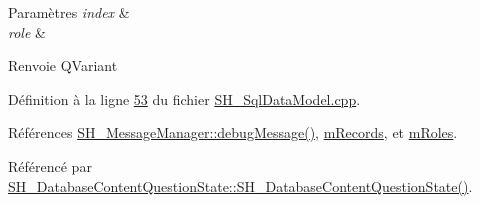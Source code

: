 \begin{DoxyParams}{Paramètres}
{\em index} & \\
\hline
{\em role} & \\
\hline
\end{DoxyParams}
\begin{DoxyReturn}{Renvoie}
Q\-Variant 
\end{DoxyReturn}


Définition à la ligne \hyperlink{SH__SqlDataModel_8cpp_source_l00053}{53} du fichier \hyperlink{SH__SqlDataModel_8cpp_source}{S\-H\-\_\-\-Sql\-Data\-Model.\-cpp}.



Références \hyperlink{classSH__MessageManager_a379f2aa0a590a5add34dbe91f98b2ff7}{S\-H\-\_\-\-Message\-Manager\-::debug\-Message()}, \hyperlink{classSH__SqlDataModel_aa58096989daac3cd3fdea5e6dd4f27ee}{m\-Records}, et \hyperlink{classSH__SqlDataModel_ad1e46c72a6aeb83e3e7bb0c3110d12a4}{m\-Roles}.



Référencé par \hyperlink{classSH__DatabaseContentQuestionState_ab26490ea519262a8f9ca72c000bf7313}{S\-H\-\_\-\-Database\-Content\-Question\-State\-::\-S\-H\-\_\-\-Database\-Content\-Question\-State()}.


